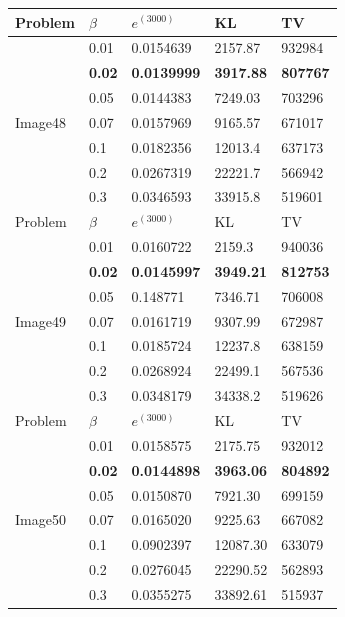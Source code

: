 \begin{table}[H]
\begin{center}
\renewcommand*{\arraystretch}{1.6}
\begin{tabular}{|C{1.8cm}|C{1cm}|C{2.2cm}|C{2.2cm}|C{2.2cm}|}
\hline
Problem & $\beta$ & $e^{(3000)}$ & KL & TV \\ \hline
 & 0.01 & 0.0154639 & 2157.87 & 932984\\ 
 & \textbf{0.02} & \textbf{0.0139999} & \textbf{3917.88} & \textbf{807767} \\ 
 & 0.05 & 0.0144383 & 7249.03 & 703296\\ 
Image48 & 0.07 & 0.0157969 & 9165.57 & 671017\\ 
 & 0.1 & 0.0182356 & 12013.4 & 637173\\ 
 & 0.2 & 0.0267319 & 22221.7 & 566942\\ 
 & 0.3 & 0.0346593 & 33915.8 & 519601\\
\hline
Problem & $\beta$ & $e^{(3000)}$ & KL & TV \\ \hline
 & 0.01 & 0.0160722 & 2159.3 & 940036\\ 
 & \textbf{0.02} & \textbf{0.0145997} & \textbf{3949.21} & \textbf{812753} \\ 
 & 0.05 & 0.148771 & 7346.71 & 706008\\ 
Image49 & 0.07 & 0.0161719 & 9307.99 & 672987\\ 
 & 0.1 & 0.0185724 & 12237.8 & 638159\\ 
 & 0.2 & 0.0268924 & 22499.1 & 567536\\ 
 & 0.3 & 0.0348179 & 34338.2 & 519626\\
\hline
Problem & $\beta$ & $e^{(3000)}$ & KL & TV \\ \hline
 & 0.01 & 0.0158575 & 2175.75 & 932012\\ 
 & \textbf{0.02} & \textbf{0.0144898} & \textbf{3963.06} & \textbf{804892} \\ 
 & 0.05 & 0.0150870 & 7921.30 & 699159\\ 
Image50 & 0.07 & 0.0165020 & 9225.63 & 667082\\ 
 & 0.1 & 0.0902397 & 12087.30 & 633079\\ 
 & 0.2 & 0.0276045 & 22290.52 & 562893\\ 
 & 0.3 & 0.0355275 & 33892.61 & 515937\\
\hline
\end{tabular}
\end{center}
\end{table}


